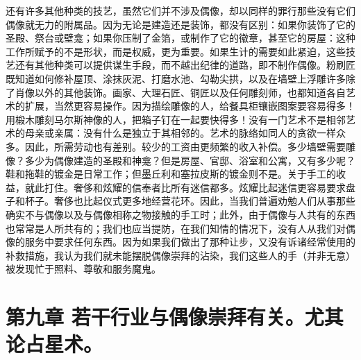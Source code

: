 还有许多其他种类的技艺，虽然它们并不涉及偶像，却以同样的罪行那些没有它们偶像就无力的附属品。因为无论是建造还是装饰，都没有区别：如果你装饰了它的圣殿、祭台或壁龛；如果你压制了金箔，或制作了它的徽章，甚至它的房屋：这种工作所赋予的不是形状，而是权威，更为重要。如果生计的需要如此紧迫，这些技艺还有其他种类可以提供谋生手段，而不越出纪律的道路，即不制作偶像。粉刷匠既知道如何修补屋顶、涂抹灰泥、打磨水池、勾勒尖拱，以及在墙壁上浮雕许多除了肖像以外的其他装饰。画家、大理石匠、铜匠以及任何雕刻师，也都知道各自艺术的扩展，当然更容易操作。因为描绘雕像的人，给餐具柜镶嵌图案要容易得多！用椴木雕刻马尔斯神像的人，把箱子钉在一起要快得多！没有一门艺术不是相邻艺术的母亲或亲属：没有什么是独立于其相邻的。艺术的脉络如同人的贪欲一样众多。因此，所需劳动也有差别。较少的工资由更频繁的收入补偿。多少墙壁需要雕像？多少为偶像建造的圣殿和神龛？但是房屋、官邸、浴室和公寓，又有多少呢？鞋和拖鞋的镀金是日常工作；但墨丘利和塞拉皮斯的镀金则不是。关于手工的收益，就此打住。奢侈和炫耀的信奉者比所有迷信都多。炫耀比起迷信更容易要求盘子和杯子。奢侈也比起仪式更多地经营花环。因此，当我们普遍劝勉人们从事那些确实不与偶像以及与偶像相称之物接触的手工时；此外，由于偶像与人共有的东西也常常是人所共有的；我们也应当提防，在我们知情的情况下，没有人从我们对偶像的服务中要求任何东西。因为如果我们做出了那种让步，又没有诉诸经常使用的补救措施，我认为我们就未能摆脱偶像崇拜的沾染，我们这些人的手（并非无意）被发现忙于照料、尊敬和服务魔鬼。\par


\section{第九章 若干行业与偶像崇拜有关。尤其论占星术。}

